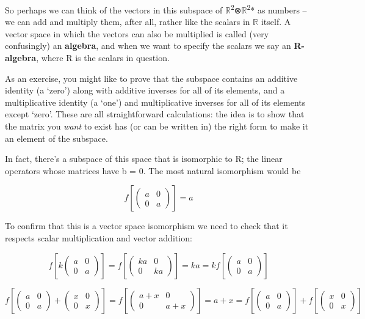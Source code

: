\documentclass[oneside,english]{amsbook}
\numberwithin{section}{chapter}
\theoremstyle{plain}
\theoremstyle{definition}
\begin{document}
So perhaps we can think of the vectors in this subspace of
$\mathbb{R}$\textsuperscript{2}⊗$\mathbb{R}$\textsuperscript{2}* as numbers
-- we can add and multiply them, after all, rather like the scalars in
$\mathbb{R}$ itself. A vector space in which the vectors can also be
multiplied is called (very confusingly) an \textbf{algebra}, and when we
want to specify the scalars we say an \textbf{R-algebra}, where R is the
scalars in question.

As an exercise, you might like to prove that the subspace contains an
additive identity (a `zero') along with additive inverses for all of
its elements, and a multiplicative identity (a `one') and
multiplicative inverses for all of its elements except `zero'. These
are all straightforward calculations: the idea is to show that the
matrix you \emph{want} to exist has (or can be written in) the right
form to make it an element of the subspace.

In fact, there's a subspace of this space that is isomorphic to R; the
linear operators whose matrices have b = 0. The most natural isomorphism
would be

\[f\left\lbrack \begin{pmatrix}
	a & 0 \\
	0 & a
\end{pmatrix} \right\rbrack = a\]

To confirm that this is a vector space isomorphism we need to check that
it respects scalar multiplication and vector addition:

\[f\left\lbrack k\begin{pmatrix}
	a & 0 \\
	0 & a
\end{pmatrix} \right\rbrack = f\left\lbrack \begin{pmatrix}
	ka & 0 \\
	0 & ka
\end{pmatrix} \right\rbrack = ka = kf\left\lbrack \begin{pmatrix}
	a & 0 \\
	0 & a
\end{pmatrix} \right\rbrack\]

\[f\left\lbrack \begin{pmatrix}
	a & 0 \\
	0 & a
\end{pmatrix} + \begin{pmatrix}
	x & 0 \\
	0 & x
\end{pmatrix} \right\rbrack = f\left\lbrack \begin{pmatrix}
	a + x & 0 \\
	0 & a + x
\end{pmatrix} \right\rbrack = a + x = f\left\lbrack \begin{pmatrix}
	a & 0 \\
	0 & a
\end{pmatrix} \right\rbrack + f\left\lbrack \begin{pmatrix}
	x & 0 \\
	0 & x
\end{pmatrix} \right\rbrack\]
\end{document}
